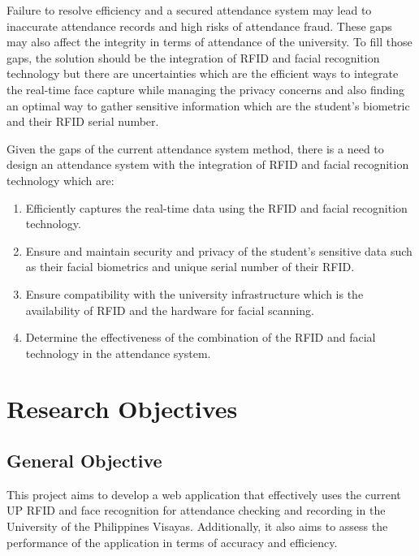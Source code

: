 Failure to resolve efficiency and a secured attendance system may lead to inaccurate attendance records and high risks of attendance fraud. These gaps may also affect the integrity in terms of attendance of the university. To fill those gaps, the solution should be the integration of RFID and facial recognition technology but there are uncertainties which are the efficient ways to integrate the real-time face capture while  managing the privacy concerns and also finding an optimal way to gather sensitive information which are the student’s biometric and their RFID serial number. 

Given the gaps of the current attendance system method, there is a need to design an attendance system with the integration of RFID and facial recognition technology which are:

\begin{enumerate}
	\item Efficiently captures the real-time data using the RFID and facial recognition technology.
	\item  Ensure and maintain security and privacy of the student’s sensitive data such as their facial biometrics and unique serial number of their RFID.  
	\item Ensure compatibility with the university infrastructure which is the availability of RFID and the hardware for facial scanning. 
	\item 	Determine the effectiveness of the combination of the RFID and facial technology in the attendance system. 
\end{enumerate}

\section{Research Objectives}
\label{sec:researchobjectives}

\subsection{General Objective}
\label{sec:generalobjective}

This project aims to develop a web application that effectively uses the current UP RFID and face recognition for attendance checking and recording in the University of the Philippines Visayas. Additionally, it also aims to assess the performance of the application in terms of accuracy and efficiency.



